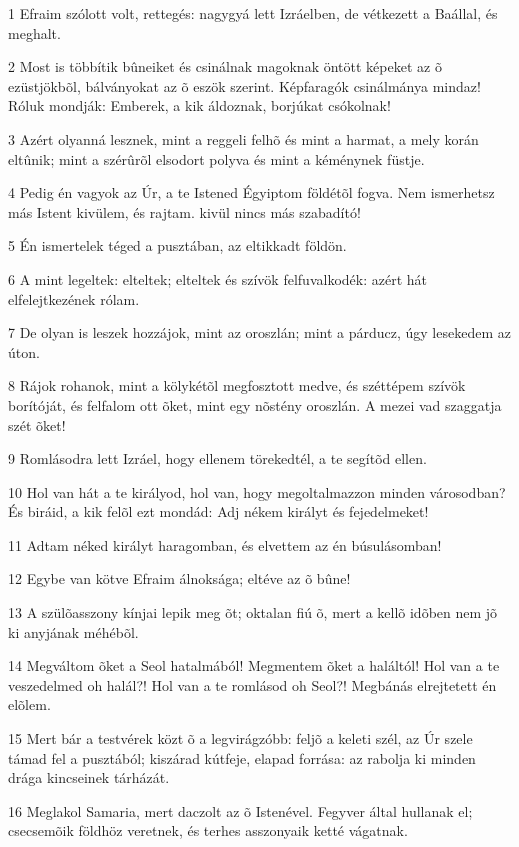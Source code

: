 \par 1 Efraim szólott volt, rettegés: nagygyá lett Izráelben, de vétkezett a Baállal, és meghalt.
\par 2 Most is többítik bûneiket és csinálnak magoknak öntött képeket az õ ezüstjökbõl, bálványokat az õ eszök szerint. Képfaragók csinálmánya mindaz! Róluk mondják: Emberek, a kik áldoznak, borjúkat  csókolnak!
\par 3 Azért olyanná lesznek, mint a reggeli felhõ és mint a harmat, a mely korán eltûnik; mint a szérûrõl elsodort polyva és mint a kéménynek füstje.
\par 4 Pedig én vagyok az Úr, a te Istened Égyiptom földétõl fogva. Nem ismerhetsz más Istent kivülem, és rajtam. kivül nincs más szabadító!
\par 5 Én ismertelek téged a pusztában, az eltikkadt földön.
\par 6 A mint legeltek: elteltek; elteltek és szívök felfuvalkodék: azért hát elfelejtkezének rólam.
\par 7 De olyan is leszek hozzájok, mint az oroszlán; mint a párducz, úgy lesekedem az úton.
\par 8 Rájok rohanok, mint a kölykétõl megfosztott medve, és széttépem szívök borítóját, és felfalom ott õket, mint egy nõstény oroszlán. A mezei vad szaggatja szét õket!
\par 9 Romlásodra lett Izráel, hogy ellenem törekedtél, a te segítõd ellen.
\par 10 Hol van hát a te királyod, hol van, hogy megoltalmazzon minden városodban? És biráid, a kik felõl ezt mondád: Adj nékem királyt és fejedelmeket!
\par 11 Adtam néked királyt haragomban, és elvettem az én búsulásomban!
\par 12 Egybe van kötve Efraim álnoksága; eltéve az õ bûne!
\par 13 A szülõasszony kínjai lepik meg õt; oktalan fiú õ, mert a kellõ idõben nem jõ ki anyjának méhébõl.
\par 14 Megváltom õket a Seol hatalmából! Megmentem õket a haláltól! Hol van a te veszedelmed oh halál?! Hol van a te romlásod oh Seol?! Megbánás elrejtetett én elõlem.
\par 15 Mert bár a testvérek közt õ a legvirágzóbb: feljõ a keleti szél, az Úr szele támad fel a pusztából; kiszárad kútfeje, elapad forrása: az rabolja ki minden drága kincseinek tárházát.
\par 16 Meglakol Samaria, mert daczolt az õ Istenével. Fegyver által hullanak el; csecsemõik földhöz veretnek, és terhes asszonyaik ketté vágatnak.

